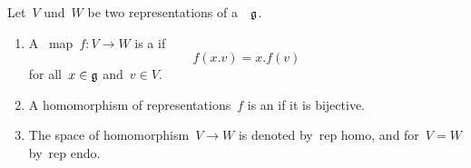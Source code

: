 \begin{definition}
  Let~$V$ und~$W$ be two representations of a~{\liealgebra{$\kf$}}~$\mathfrak{g}$.
  \begin{enumerate}
    \item
      A~{\linear{$\kf$}} map~$f \colon V \to W$ is a  if
      \[
        f(x.v) = x.f(v)
      \]
      for all~$x \in \mathfrak{g}$ and~$v \in V$.
    \item
      A homomorphism of representations~$f$ is an  if it is bijective.
    \item
      The space of homomorphism~$V \to W$ is denoted by~\gls*{rep homo}, and for~$V = W$ by~\gls*{rep endo}.
  \end{enumerate}
\end{definition}

